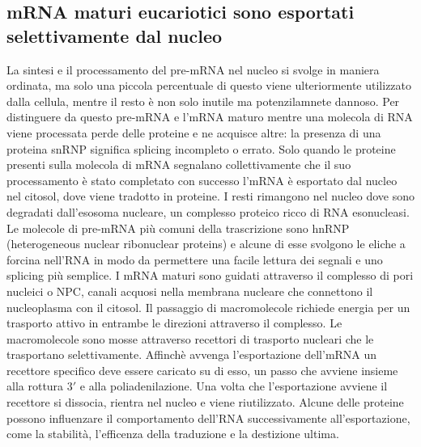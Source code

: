\subsection{mRNA maturi eucariotici sono esportati selettivamente dal nucleo}
La sintesi e il processamento del pre-mRNA nel nucleo si svolge in maniera ordinata, ma solo una piccola percentuale di questo viene ulteriormente utilizzato dalla cellula, mentre il
resto \`e non solo inutile ma potenzilamnete dannoso. Per distinguere da questo pre-mRNA e l'mRNA maturo mentre una molecola di RNA viene processata perde delle proteine e ne 
acquisce altre: la presenza di una proteina snRNP significa splicing incompleto o errato. Solo quando le proteine presenti sulla molecola di mRNA segnalano collettivamente che il
suo processamento \`e stato completato con successo l'mRNA \`e esportato dal nucleo nel citosol, dove viene tradotto in proteine. I resti rimangono nel nucleo dove sono degradati
dall'esosoma nucleare, un complesso proteico ricco di RNA esonucleasi. Le molecole di pre-mRNA pi\`u comuni della trascrizione sono hnRNP (heterogeneous nuclear ribonuclear proteins) e 
alcune di esse svolgono le eliche a forcina nell'RNA in modo da permettere una facile lettura dei segnali e uno splicing pi\`u semplice. I mRNA maturi sono guidati attraverso il 
complesso di pori nucleici o NPC, canali acquosi nella membrana nucleare che connettono il nucleoplasma con il citosol. Il passaggio di macromolecole richiede energia per un trasporto
attivo in entrambe le direzioni attraverso il complesso. Le macromolecole sono mosse attraverso recettori di trasporto nucleari che le trasportano selettivamente. Affinch\`e avvenga 
l'esportazione dell'mRNA un recettore specifico deve essere caricato su di esso, un passo che avviene insieme alla rottura $3'$ e alla poliadenilazione. Una volta che l'esportazione
avviene il recettore si dissocia, rientra nel nucleo e viene riutilizzato. Alcune delle proteine possono influenzare il comportamento dell'RNA successivamente all'esportazione, come
la stabilit\`a, l'efficenza della traduzione e la destizione ultima. 
